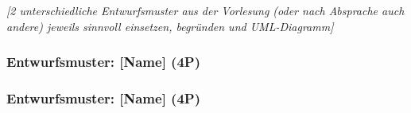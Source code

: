 \emph{[2 unterschiedliche Entwurfsmuster aus der Vorlesung (oder nach Absprache auch andere) jeweils
sinnvoll einsetzen, begründen und UML-Diagramm]}

\subsubsection{Entwurfsmuster: [Name] (4P)}
\subsubsection{Entwurfsmuster: [Name] (4P)}

\newpage
\titlespacing*{\chapter}{0pt}{-30mm}{10pt}
  


